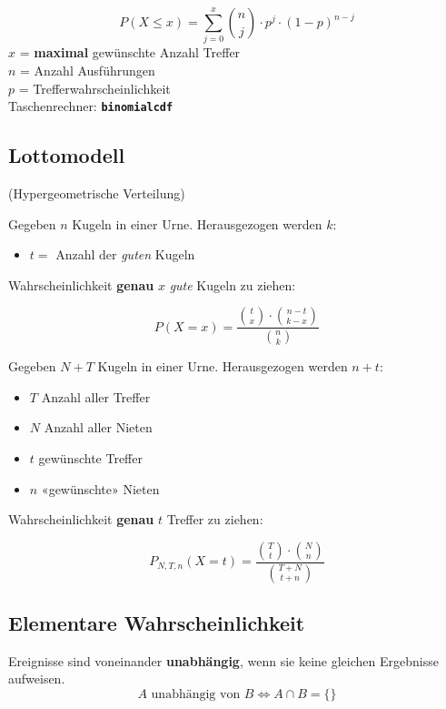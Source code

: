 \begin{multicols}{2}
\begin{tcolorbox}[colback=white]
$$P(X\le x) = \sum_{j=0}^{x}{n \choose j}\cdot{}p^j\cdot{}(1-p)^{n-j}$$
$x$ = \textbf{maximal} gewünschte Anzahl Treffer\\
$n$ = Anzahl Ausführungen\\
$p$ = Trefferwahrscheinlichkeit\\
Taschenrechner: \textbf{\texttt{binomialcdf}}
\end{tcolorbox}

\forceCB{}

\subsection*{Lottomodell}
(Hypergeometrische Verteilung)

\ifisRLP
\begin{tcolorbox}[colback=white]
Gegeben $n$ Kugeln in einer Urne. Herausgezogen werden $k$:
\begin{itemize}
\item $t =$ Anzahl der \textit{guten} Kugeln
\end{itemize}
Wahrscheinlichkeit \textbf{genau} $x$ \textit{gute} Kugeln zu ziehen:

$$P(X=x) = \frac{ {t \choose x} \cdot {n-t  \choose k-x} }{{n \choose k}}$$
\end{tcolorbox}
\else
\begin{tcolorbox}[colback=white]
Gegeben $N+T$ Kugeln in einer Urne. Herausgezogen werden $n+t$:
\begin{itemize}
\item $T$ Anzahl aller Treffer
\item $N$ Anzahl aller Nieten
\item $t$ gewünschte Treffer
\item $n$ «gewünschte» Nieten
\end{itemize}
Wahrscheinlichkeit \textbf{genau} $t$ Treffer zu ziehen:

$$P_{N,T,n}(X=t) = \frac{ {T \choose t} \cdot {N  \choose n} }{{T+N \choose t+n}}$$
\end{tcolorbox}
\fi%


\subsection*{Elementare Wahrscheinlichkeit}
Ereignisse sind voneinander \textbf{unabhängig}, wenn sie keine
gleichen Ergebnisse aufweisen.
$$A \textrm{ unabhängig von } B \Leftrightarrow A\cap B=\{\}$$


\end{multicols}
